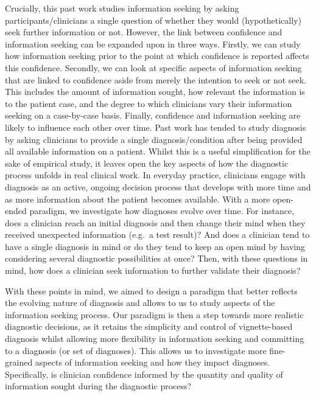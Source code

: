 \documentclass[a4paper, nobind]{templates/ociamthesis}
\begin{document}
Crucially, this past work studies information seeking by asking participants/clinicians a single question of whether they would (hypothetically) seek further information or not. However, the link between confidence and information seeking can be expanded upon in three ways. Firstly, we can study how information seeking prior to the point at which confidence is reported affects this confidence. Secondly, we can look at specific aspects of information seeking that are linked to confidence aside from merely the intention to seek or not seek. This includes the amount of information sought, how relevant the information is to the patient case, and the degree to which clinicians vary their information seeking on a case-by-case basis. Finally, confidence and information seeking are likely to influence each other over time. Past work has tended to study diagnosis by asking clinicians to provide a single diagnosis/condition after being provided all available information on a patient. Whilst this is a useful simplification for the sake of empirical study, it leaves open the key aspects of how the diagnostic process unfolds in real clinical work. In everyday practice, clinicians engage with diagnosis as an active, ongoing decision process that develops with more time and as more information about the patient becomes available. With a more open-ended paradigm, we investigate how diagnoses evolve over time. For instance, does a clinician reach an initial diagnosis and then change their mind when they received unexpected information (e.g.~a test result)? And does a clinician tend to have a single diagnosis in mind or do they tend to keep an open mind by having considering several diagnostic possibilities at once? Then, with these questions in mind, how does a clinician seek information to further validate their diagnosis?

\hfill\break
With these points in mind, we aimed to design a paradigm that better reflects the evolving nature of diagnosis and allows to us to study aspects of the information seeking process. Our paradigm is then a step towards more realistic diagnostic decisions, as it retains the simplicity and control of vignette-based diagnosis whilst allowing more flexibility in information seeking and committing to a diagnosis (or set of diagnoses). This allows us to investigate more fine-grained aspects of information seeking and how they impact diagnoses. Specifically, is clinician confidence informed by the quantity and quality of information sought during the diagnostic process?
\end{document}
